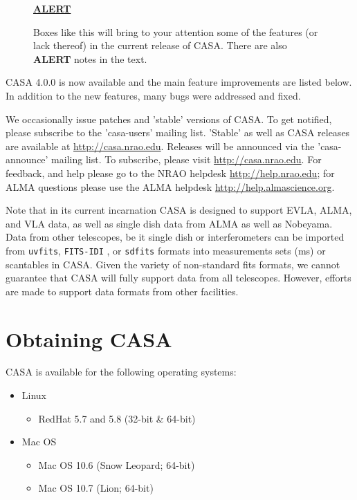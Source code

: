 \begin{wrapfigure}{r}{2.5in}
  \begin{boxedminipage}{2.5in}
     \centerline{\underline{\bf ALERT}}
     Boxes like this will bring to your attention some of the
     features (or lack thereof) in the current release
     of CASA.  There are also {\bf ALERT} notes in the text.
  \end{boxedminipage}
\end{wrapfigure}

CASA 4.0.0 is now available and the main feature improvements are
listed below. In addition to the new features, many bugs were
addressed and fixed.

We occasionally issue patches and 'stable' versions of CASA. To get
notified, please subscribe to the 'casa-users' mailing list. 'Stable'
as well as CASA releases are available at
\url{http://casa.nrao.edu}. Releases will be announced via the
'casa-announce' mailing list. To subscribe, please visit
\url{http://casa.nrao.edu}. For feedback, and help please go to the
NRAO helpdesk \url{http://help.nrao.edu}; for ALMA questions please
use the ALMA helpdesk \url{http://help.almascience.org}.

Note that in its current incarnation CASA is designed to support EVLA,
ALMA, and VLA data, as well as single dish data from ALMA as well as
Nobeyama. Data from other telescopes, be it single dish or
interferometers can be imported from {\tt uvfits}, {\tt FITS-IDI} , or
{\tt sdfits} formats into measurements sets (ms) or scantables in
CASA. Given the variety of non-standard fits formats, we cannot
guarantee that CASA will fully support data from all
telescopes. However, efforts are made to support data formats from
other facilities.




\section{Obtaining CASA}
\label{section:intro.obtaining}


CASA is available for the following operating systems:

\begin{itemize}
    \item Linux
      \begin{itemize}
          \item RedHat 5.7 and 5.8 (32-bit \& 64-bit)
      \end{itemize}
      

    \item Mac OS
         \begin{itemize}
          \item Mac OS 10.6 (Snow Leopard; 64-bit) 
          \item Mac OS 10.7 (Lion; 64-bit)
\end{itemize}
\end{itemize}


